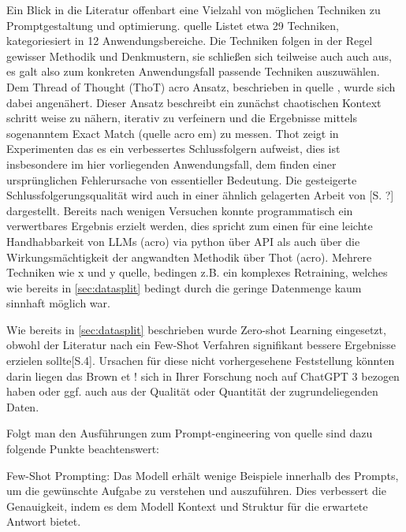 Ein Blick in die Literatur offenbart eine Vielzahl von möglichen Techniken zu Promptgestaltung und optimierung. quelle Listet etwa 29 Techniken, kategoriesiert in 12 Anwendungsbereiche\autocite[S. 3]{Sahoo2024}. Die Techniken folgen in der Regel gewisser Methodik und Denkmustern, sie schließen sich teilweise auch auch aus, es galt also zum konkreten Anwendungsfall passende Techniken auszuwählen. Dem Thread of Thought (ThoT) acro Ansatz, beschrieben in quelle \autocite{Zhou2023}, wurde sich dabei angenähert. Dieser Ansatz beschreibt ein zunächst chaotischen Kontext schritt weise zu nähern, iterativ zu verfeinern und die Ergebnisse mittels sogenanntem Exact Match (quelle acro em) zu messen. Thot zeigt in Experimenten das es ein verbessertes Schlussfolgern aufweist, dies ist insbesondere im hier vorliegenden Anwendungsfall, dem finden einer ursprünglichen Fehlerursache von essentieller Bedeutung. Die gesteigerte Schlussfolgerungsqualität wird auch in einer ähnlich gelagerten Arbeit von \autocite{Wei2022}[S. ?] dargestellt. Bereits nach wenigen Versuchen konnte programmatisch ein verwertbares Ergebnis erzielt werden, dies spricht zum einen für eine leichte Handhabbarkeit von LLMs (acro) via python über API als auch über die Wirkungsmächtigkeit der angwandten Methodik über Thot (acro). Mehrere Techniken wie x und y quelle, bedingen z.B. ein komplexes Retraining, welches wie bereits in \autoref{sec:datasplit} bedingt durch die geringe Datenmenge kaum sinnhaft möglich war.

Wie bereits in \autoref{sec:datasplit} beschrieben wurde Zero-shot Learning eingesetzt, obwohl der Literatur nach ein Few-Shot Verfahren signifikant bessere Ergebnisse erzielen sollte\autocite{Brown2020}[S.4]. Ursachen für diese nicht vorhergesehene Feststellung könnten darin liegen das Brown et \auterref! sich in Ihrer Forschung noch auf ChatGPT 3 bezogen haben oder ggf. auch aus der Qualität oder Quantität der zugrundeliegenden Daten.



Folgt man den Ausführungen zum Prompt-engineering von quelle sind dazu folgende Punkte beachtenswert:

Few-Shot Prompting: Das Modell erhält wenige Beispiele innerhalb des Prompts, um die gewünschte Aufgabe zu verstehen und auszuführen. Dies verbessert die Genauigkeit, indem es dem Modell Kontext und Struktur für die erwartete Antwort bietet. 
